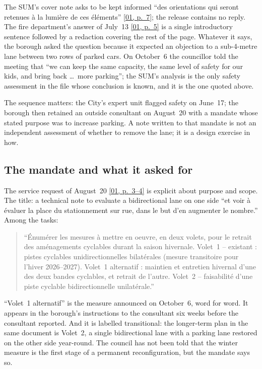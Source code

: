 \documentclass[11pt,letterpaper]{article}
\newcommand{\pagesurl}{https://openmobilitydata.github.io/Terrebonne-access-requests}
\newcommand{\pgl}[3]{\href{\pagesurl/\csname bundle#1\endcsname\#page=#2}{\textsf{\small[#1, p.~#3]}}}
\newcommand{\pg}[2]{\pgl{#1}{#2}{#2}}
\newcommand{\quot}[1]{\begin{quote}\small #1\end{quote}}
\begin{document}
The SUM's cover note asks to be kept informed ``des orientations qui seront
retenues \`a la lumi\`ere de ces \'el\'ements'' \pg{01}{7}; the release contains
no reply. The fire department's answer of July~13 \pg{01}{5} is a single
introductory sentence followed by a redaction covering the rest of the page.
Whatever it says, the borough asked the question because it expected an
objection to a sub-4-metre lane between two rows of parked cars. On
October~6 the councillor told the meeting that ``we can keep the same
capacity, the same level of safety for our kids, and bring back \ldots\
more parking''; the SUM's analysis is the only safety assessment in the
file whose conclusion is known, and it is the one quoted above.

The sequence matters: the City's expert unit flagged safety on June~17; the
borough then retained an outside consultant on August~20 with a mandate
whose stated purpose was to increase parking. A note written to that mandate
is not an independent assessment of whether to remove the lane; it is a
design exercise in how.

\subsection{The mandate and what it asked for}

The service request of August~20 \pgl{01}{3}{3--4} is explicit about purpose and
scope. The title: a technical note to evaluate a bidirectional lane on one
side ``et voir \`a \'evaluer la place du stationnement sur rue, dans le but
d'en augmenter le nombre.'' Among the tasks:

\quot{``\'Enum\'erer les mesures \`a mettre en oeuvre, en deux volets, pour le
retrait des am\'enagements cyclables durant la saison hivernale.
Volet~1 -- existant : pistes cyclables unidirectionnelles bilat\'erales
(mesure transitoire pour l'hiver 2026--2027). Volet~1 alternatif : maintien
et entretien hivernal d'une des deux bandes cyclables, et retrait de
l'autre. Volet~2 -- faisabilit\'e d'une piste cyclable bidirectionnelle
unilat\'erale.''}

``Volet~1 alternatif'' is the measure announced on October~6, word for
word. It appears in the borough's instructions to the consultant six weeks
before the consultant reported. And it is labelled transitional: the
longer-term plan in the same document is Volet~2, a single bidirectional
lane with a parking lane restored on the other side year-round. The
council has not been told that the winter measure is the first stage of a
permanent reconfiguration, but the mandate says so.
\end{document}
